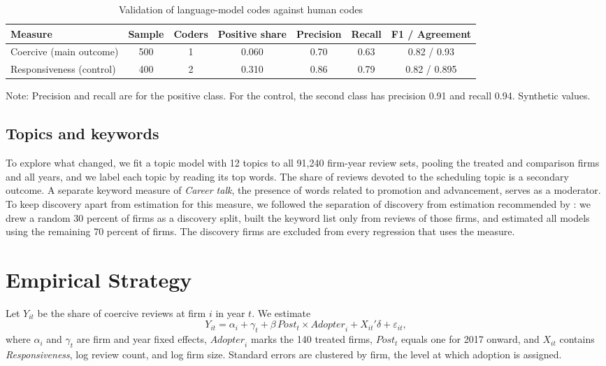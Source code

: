 \documentclass[12pt]{article}
\begin{document}
\begin{table}[t]
\centering
\begin{threeparttable}
\caption{Validation of language-model codes against human codes}\label{tab:valid}
\begin{tabular}{lcccccc}
\toprule
Measure & Sample & Coders & Positive share & Precision & Recall & F1 / Agreement\\
\midrule
Coercive (main outcome) & 500 & 1 & 0.060 & 0.70 & 0.63 & 0.82 / 0.93\\
Responsiveness (control) & 400 & 2 & 0.310 & 0.86 & 0.79 & 0.82 / 0.895\\
\bottomrule
\end{tabular}
\begin{tablenotes}\footnotesize
\item Note: Precision and recall are for the positive class. For the control, the second class has precision 0.91 and recall 0.94. Synthetic values.
\end{tablenotes}
\end{threeparttable}
\end{table}

\subsection{Topics and keywords}
To explore what changed, we fit a topic model with 12 topics to all 91,240 firm-year review sets, pooling the treated and comparison firms and all years, and we label each topic by reading its top words. The share of reviews devoted to the scheduling topic is a secondary outcome. A separate keyword measure of \emph{Career talk}, the presence of words related to promotion and advancement, serves as a moderator. To keep discovery apart from estimation for this measure, we followed the separation of discovery from estimation recommended by \citet{egami2022texts}: we drew a random 30 percent of firms as a discovery split, built the keyword list only from reviews of those firms, and estimated all models using the remaining 70 percent of firms. The discovery firms are excluded from every regression that uses the measure.

\section{Empirical Strategy}
Let $Y_{it}$ be the share of coercive reviews at firm $i$ in year $t$. We estimate
\begin{equation}
Y_{it} = \alpha_i + \gamma_t + \beta\,\mathit{Post}_{t}\times\mathit{Adopter}_{i} + X_{it}'\delta + \varepsilon_{it},
\end{equation}
where $\alpha_i$ and $\gamma_t$ are firm and year fixed effects, $\mathit{Adopter}_i$ marks the 140 treated firms, $\mathit{Post}_t$ equals one for 2017 onward, and $X_{it}$ contains \emph{Responsiveness}, log review count, and log firm size. Standard errors are clustered by firm, the level at which adoption is assigned.
\end{document}
